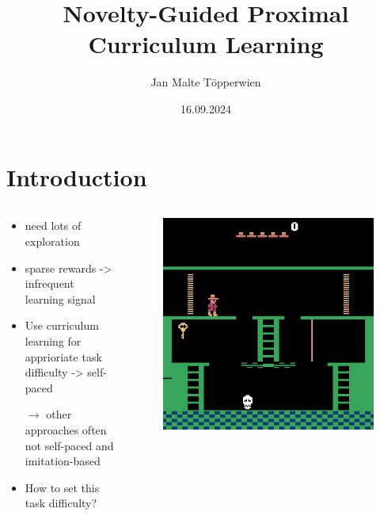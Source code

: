 \documentclass[aspectratio=169]{beamer}
\title{Novelty-Guided Proximal Curriculum Learning}
\author{Jan Malte Töpperwien}
\date{16.09.2024}
\begin{document}
\begin{frame}
  \titlepage
\end{frame}

\section{Introduction}
\begin{frame}
  \begin{columns}[]
    \begin{column}{0.48\textwidth}
      \begin{itemize}
        \item need lots of exploration
        \item sparse rewards -> infrequent learning signal
        \item Use curriculum learning for apprioriate task difficulty -> self-paced
        \item[$\rightarrow$] other approaches often not self-paced and imitation-based
        \item How to set this task difficulty?
      \end{itemize}
    \end{column}
    \hfill
    \begin{column}{0.48\textwidth}
      \begin{figure}
        \includegraphics[width=\textwidth, height=\textheight, keepaspectratio]{./images/learning-montezumas-revenge-from-a-single-demonstration}
      \end{figure}
    \end{column}
  \end{columns}
\end{frame}
\end{document}
